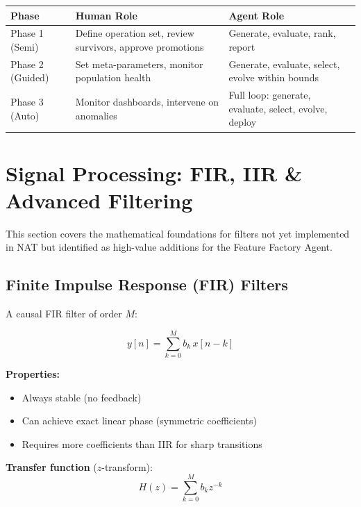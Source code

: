 \documentclass[11pt,a4paper]{article}
\begin{document}
\begin{center}
\begin{tabular}{l p{4cm} p{5cm}}
\hline
\textbf{Phase} & \textbf{Human Role} & \textbf{Agent Role} \\
\hline
Phase 1 (Semi) & Define operation set, review survivors, approve promotions & Generate, evaluate, rank, report \\
Phase 2 (Guided) & Set meta-parameters, monitor population health & Generate, evaluate, select, evolve within bounds \\
Phase 3 (Auto) & Monitor dashboards, intervene on anomalies & Full loop: generate, evaluate, select, evolve, deploy \\
\hline
\end{tabular}
\end{center}

\newpage
\section{Signal Processing: FIR, IIR \& Advanced Filtering}

This section covers the mathematical foundations for filters not yet implemented in NAT but identified as high-value additions for the Feature Factory Agent.

\subsection{Finite Impulse Response (FIR) Filters}

A causal FIR filter of order $M$:

\begin{equation}
y[n] = \sum_{k=0}^{M} b_k \, x[n-k]
\end{equation}

\textbf{Properties:}
\begin{itemize}
    \item Always stable (no feedback)
    \item Can achieve exact linear phase (symmetric coefficients)
    \item Requires more coefficients than IIR for sharp transitions
\end{itemize}

\textbf{Transfer function} ($z$-transform):
\begin{equation}
H(z) = \sum_{k=0}^{M} b_k z^{-k}
\end{equation}
\end{document}
